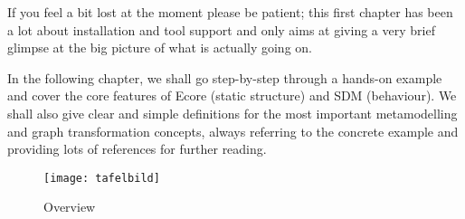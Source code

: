\begin{enumerate}
If you feel a bit lost at the moment please be patient; this first chapter has been a lot about installation and tool support and only aims at giving a very brief glimpse at the big picture of what is actually going on.    

In the following chapter, we shall go step-by-step through a hands-on example and cover the core features of Ecore (static structure) and SDM (behaviour). 
We shall also give clear and simple definitions for the most important metamodelling and graph transformation concepts, always referring to the concrete example and providing lots of references for further reading.

\vspace{1cm}

\begin{figure}[htbp]
	\centering
  \texttt{[image: tafelbild]}
	\caption{Overview}
	\label{fig_Overview}
\end{figure}

\end{enumerate}